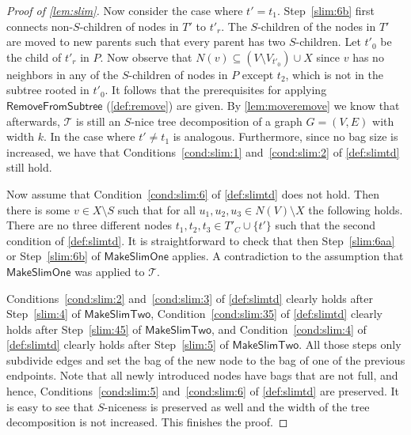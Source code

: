 \documentclass[a4paper,UKenglish,cleveref, autoref, thm-restate, numberwithinsect]{lipics-v2021}
\newcommand{\RemoveFromSubtree}{\mathsf{RemoveFromSubtree}}
\newcommand{\MakeSlim}{\mathsf{MakeSlimOne}}
\newcommand{\MakeSlimTwo}{\mathsf{MakeSlimTwo}}
\begin{document}
\begin{proof}[Proof of \cref{lem:slim}]
Now consider the case where $t'=t_1$. Step~\ref{slim:6b} first connects non-$S$-children of nodes in $T'$ to $t'_r$. 
The $S$-children of the nodes in $T'$ are moved to new parents such that every parent has two $S$-children. Let $t'_0$ be the child of $t'_r$ in $P$. Now observe that $N(v)\subseteq (V\setminus V_{t'_0})\cup X$ since $v$ has no neighbors in any of the $S$-children of nodes in $P$ except $t_2$, which is not in the subtree rooted in $t'_0$. It follows that the prerequisites for applying $\RemoveFromSubtree$ (\cref{def:remove}) are given. By \cref{lem:moveremove} we know that afterwards, $\mathcal{T}$ is still an $S$-nice tree decomposition of a graph $G=(V,E)$ with width $k$. 
In the case where $t'\neq t_1$ is analogous.
Furthermore, since no bag size is increased, we have that Conditions~\ref{cond:slim:1} and~\ref{cond:slim:2} of \cref{def:slimtd} still hold.

Now assume that Condition~\ref{cond:slim:6} of \cref{def:slimtd} does not hold. Then there is some $v\in X\setminus S$ such that for all $u_1,u_2,u_3\in N(V)\setminus X$ the following holds. There are no three different nodes $t_1,t_2,t_3\in T'_C\cup\{t'\}$ such that the second condition of \cref{def:slimtd}. It is straightforward to check that then Step~\ref{slim:6aa} or Step~\ref{slim:6b} of $\MakeSlim$ applies. A contradiction to the assumption that $\MakeSlim$ was applied to $\mathcal{T}$. 



Conditions~\ref{cond:slim:2} and~\ref{cond:slim:3} of \cref{def:slimtd} clearly holds after Step~\ref{slim:4} of $\MakeSlimTwo$, Condition~\ref{cond:slim:35} of \cref{def:slimtd} clearly holds after Step~\ref{slim:45} of $\MakeSlimTwo$, and Condition~\ref{cond:slim:4} of \cref{def:slimtd} clearly holds after Step~\ref{slim:5} of $\MakeSlimTwo$.
All those steps only subdivide edges and set the bag of the new node to the bag of one of the previous endpoints. Note that all newly introduced nodes have bags that are not full, and hence, Conditions~\ref{cond:slim:5} and~\ref{cond:slim:6} of \cref{def:slimtd} are preserved. It is easy to see that $S$-niceness is preserved as well and the width of the tree decomposition is not increased.
This finishes the proof.
\end{proof}
\end{document}
